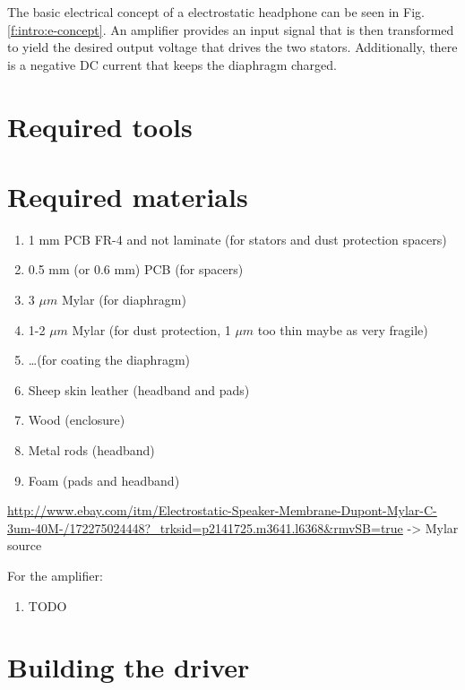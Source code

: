 \documentclass{article}
\begin{document}
The basic electrical concept of a electrostatic headphone can be seen in Fig. \ref{f:intro:e-concept}. An amplifier provides an input signal that is then transformed to yield the desired output voltage that drives the two stators. Additionally, there is a negative DC current that keeps the diaphragm charged.

\section{Required tools}
\label{s:tools}

\section{Required materials}
\label{s:materials}
\begin{enumerate}
    \item 1 mm PCB FR-4 and not laminate (for stators and dust protection spacers)
    \item 0.5 mm (or 0.6 mm) PCB (for spacers)
    \item 3 $\mu m$ Mylar (for diaphragm)
    \item 1-2 $\mu m$ Mylar (for dust protection, 1 $\mu m$ too thin maybe as very fragile) %
    \item \ldots (for coating the diaphragm) %
    \item Sheep skin leather (headband and pads)
    \item Wood (enclosure)
    \item Metal rods (headband)
    \item Foam (pads and headband)
\end{enumerate}

\url{http://www.ebay.com/itm/Electrostatic-Speaker-Membrane-Dupont-Mylar-C-3um-40M-/172275024448?_trksid=p2141725.m3641.l6368&rmvSB=true} -> Mylar source

For the amplifier:
\begin{enumerate}
    \item TODO
\end{enumerate}

\section{Building the driver}
\label{s:driver}
\end{document}
